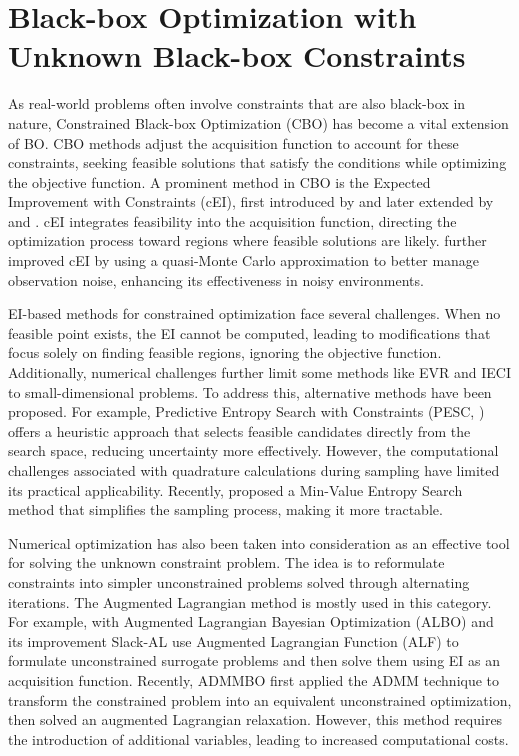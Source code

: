 \section{Black-box Optimization with Unknown Black-box Constraints}
\label{section:bo_unknown_constraints}
As real-world problems often involve constraints that are also black-box in nature, Constrained Black-box Optimization (CBO) has become a vital extension of BO. CBO methods adjust the acquisition function to account for these constraints, seeking feasible solutions that satisfy the conditions while optimizing the objective function. A prominent method in CBO is the Expected Improvement with Constraints (cEI), first introduced by \citep{schonlau1998global} and later extended by \citep{gardner2014bayesian} and \citep{gelbart2014bayesian}. cEI integrates feasibility into the acquisition function, directing the optimization process toward regions where feasible solutions are likely. \citet{letham2019constrained} further improved cEI by using a quasi-Monte Carlo approximation to better manage observation noise, enhancing its effectiveness in noisy environments.

EI-based methods for constrained optimization face several challenges. When no feasible point exists, the EI cannot be computed, leading to modifications that focus solely on finding feasible regions, ignoring the objective function. Additionally, numerical challenges further limit some methods like EVR and IECI to small-dimensional problems. To address this, alternative methods have been proposed. For example, Predictive Entropy Search with Constraints (PESC,  \citealp{hernandez2015predictive}) offers a heuristic approach that selects feasible candidates directly from the search space, reducing uncertainty more effectively. However, the computational challenges associated with quadrature calculations during sampling have limited its practical applicability. Recently, \citet{takeno2022sequential} proposed a Min-Value Entropy Search method that simplifies the sampling process, making it more tractable.

Numerical optimization has also been taken into consideration as an effective tool for solving the unknown constraint problem. The idea is to reformulate constraints into simpler unconstrained problems solved through alternating iterations. The Augmented Lagrangian method is mostly used in this category. For example, \citet{gramacy2016modeling} with Augmented Lagrangian Bayesian Optimization (ALBO) and its improvement Slack-AL \citep{picheny2016bayesian} use Augmented Lagrangian Function (ALF) to formulate unconstrained surrogate problems and then solve them using EI as an acquisition function. Recently, ADMMBO \citep{ariafar2019admmbo} first applied the ADMM technique to transform the constrained problem into an equivalent unconstrained optimization, then solved an augmented Lagrangian relaxation. However, this method requires the introduction of additional variables, leading to increased computational costs.

